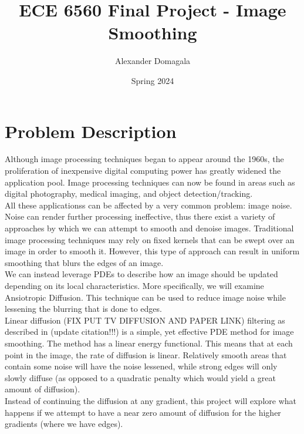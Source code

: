 \documentclass{article}
\title{\textbf{ECE 6560 Final Project - Image Smoothing}}
\author{Alexander Domagala}
\date{Spring 2024}
\begin{document}
  \maketitle

  \section{Problem Description}
  Although image processing techniques began to appear around the 1960s, the proliferation of inexpensive
  digital computing power has greatly widened the application pool. Image processing techniques
  can now be found in areas such as digital photography, medical imaging, and object detection/tracking.\\

  \noindent
  All these applicationss can be affected by a very common problem: image noise.
  Noise can render further processing ineffective, thus there exist a variety of approaches by which
  we can attempt to smooth and denoise images. Traditional image processing techniques
  may rely on fixed kernels that can be swept over an image in order to smooth it. However,
  this type of approach can result in uniform smoothing that blurs the edges of an image.\\

  \noindent
  We can instead leverage PDEs to describe how an image should be updated depending on its local characteristics.
  More specifically, we will examine Ansiotropic Diffusion. This technique can be used to reduce image noise
  while lessening the blurring that is done to edges.\\

  \noindent
  Linear diffusion (FIX PUT TV DIFFUSION AND PAPER LINK) filtering as described in \cite{Thomas_book} (update citation!!!) is a simple,
  yet effective PDE method for image smoothing. The method has a linear energy functional. This means that at each
  point in the image, the rate of diffusion is linear. Relatively smooth areas that contain some noise will have
  the noise lessened, while strong edges will only slowly diffuse (as opposed to a quadratic penalty which would
  yield a great amount of diffusion).\\

  \noindent
  Instead of continuing the diffusion at any gradient, this project will explore what happens if we
  attempt to have a near zero amount of diffusion for the higher gradients (where we have edges).
\end{document}
